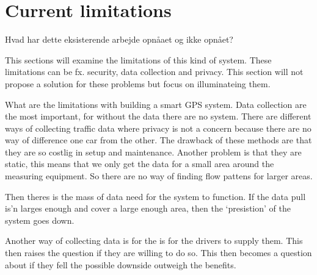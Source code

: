 \section{Current limitations}
Hvad har dette eksisterende arbejde opnåaet og ikke opnået?


This sections will examine the limitations of this kind of system. These limitations can be fx. security, data collection and privacy. This section will not propose a solution for these problems but focus on illuminateing them.
\newline

What are the limitations with building a smart GPS system. Data collection are the most important, for without the data there are no system. There are different ways of collecting traffic data where privacy is not a concern because there are no way of difference one car from the other. The drawback of these methods are that they are so costlig in setup and maintenance. Another problem is that they are static, this means that we only get the data for a small area around the measuring equipment. So there are no way of finding flow pattens for larger areas.

Then theres is the mass of data need for the system to function. If the data pull is'n larges enough and cover a large enough area, then the `presistion' of the system goes down.

Another way of collecting data is for the is for the drivers to supply them. This then raises the question if they are willing to do so. This then becomes a question about if they fell the possible downside outweigh the benefits.
